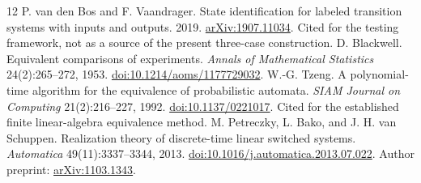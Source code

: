 \documentclass[11pt,letterpaper]{article}
\theoremstyle{plain}
\theoremstyle{definition}
\begin{document}
\begin{thebibliography}{12}
 P. van den Bos and F. Vaandrager. State identification for labeled transition systems with inputs and outputs. 2019. \href{https://arxiv.org/abs/1907.11034}{arXiv:1907.11034}. Cited for the testing framework, not as a source of the present three-case construction.
 D. Blackwell. Equivalent comparisons of experiments. \emph{Annals of Mathematical Statistics} 24(2):265--272, 1953. \href{https://doi.org/10.1214/aoms/1177729032}{doi:10.1214/aoms/1177729032}.
 W.-G. Tzeng. A polynomial-time algorithm for the equivalence of probabilistic automata. \emph{SIAM Journal on Computing} 21(2):216--227, 1992. \href{https://doi.org/10.1137/0221017}{doi:10.1137/0221017}. Cited for the established finite linear-algebra equivalence method.
 M. Petreczky, L. Bako, and J. H. van Schuppen. Realization theory of discrete-time linear switched systems. \emph{Automatica} 49(11):3337--3344, 2013. \href{https://doi.org/10.1016/j.automatica.2013.07.022}{doi:10.1016/j.automatica.2013.07.022}. Author preprint: \href{https://arxiv.org/abs/1103.1343}{arXiv:1103.1343}.
\end{thebibliography}
\end{document}
